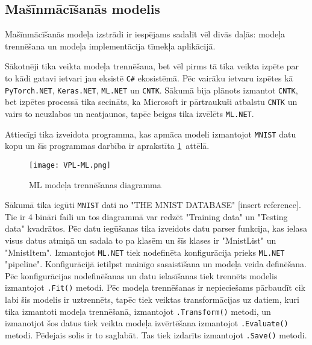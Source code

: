 \subsection{Mašīnmācīšanās modelis}

    Mašīnmācīšanās modeļa izstrādi ir iespējams sadalīt vēl divās daļās: modeļa trennēšana un modeļa
    implementācija tīmekļa aplikācijā.

    Sākotnēji tika veikta modeļa trennēšana, bet vēl pirms tā tika veikta izpēte par to kādi gatavi
    ietvari jau eksistē \texttt{C\#} ekosistēmā. Pēc vairāku ietvaru izpētes kā \texttt{PyTorch.NET},
    \texttt{Keras.NET}, \texttt{ML.NET} un \texttt{CNTK}. Sākumā bija plānots izmantot \texttt{CNTK},
    bet izpētes processā tika secināts, ka Microsoft ir pārtraukuši atbalstu \texttt{CNTK} un vairs
    to neuzlabos un neatjaunos, tapēc beigas tika izvēlēts \texttt{ML.NET}.

    Attiecīgi tika izveidota programma, kas apmāca modeli izmantojot \texttt{MNIST} datu kopu un
    šīs programmas darbība ir aprakstīta \ref{ml:train}~attēlā.

    \begin{figure}[H]
        \centering
        \texttt{[image: VPL-ML.png]}
        \caption{ML modeļa trennēšanas diagramma}
        \label{ml:train}
    \end{figure}

    Sākumā tika iegūti \texttt{MNIST} dati no "THE MNIST DATABASE" [insert reference]. Tie ir 4 bināri
    faili un tos diagrammā var redzēt "Training data" un "Testing data" kvadrātos. Pēc datu iegūšanas
    tika izveidots datu parser funkcija, kas ielasa visus datus atmiņā un sadala to pa klasēm un šīs
    klases ir "MnistList" un "MnistItem". Izmantojot \texttt{ML.NET} tiek nodefinēta konfigurācija
    prieks \texttt{ML.NET} "pipeline". Konfigurācijā ietilpst mainīgo sasaistīšana un modeļa veida
    definēšana. Pēc konfigurācijas nodefinēšanas un datu ielasīšanas tiek trennēts modelis izmantojot
    \texttt{.Fit()} metodi. Pēc modeļa trennēšanas ir nepieciešams pārbaudīt cik labi šis
    modelis ir uztrennēts, tapēc tiek veiktas transformācijas uz datiem, kuri tika izmantoti modeļa
    trennēšanā, izmantojot \texttt{.Transform()} metodi, un izmanotjot šos datus tiek
    veikta modeļa izvērtēšana izmantojot \texttt{.Evaluate()} metodi. Pēdejais solis ir
    to saglabāt. Tas tiek izdarīts izmantojot \texttt{.Save()} metodi.


